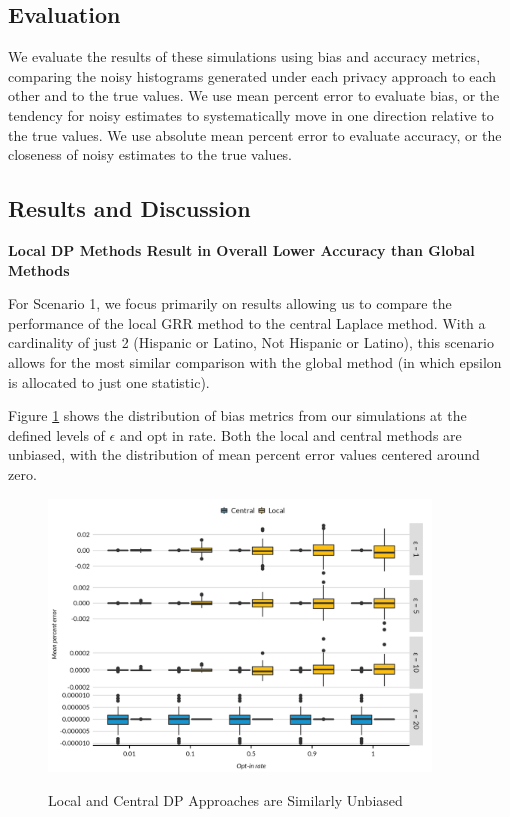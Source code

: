 \documentclass[
]{urban-formatting}
\begin{document}
\subsection{Evaluation}

We evaluate the results of these simulations using bias and accuracy
metrics, comparing the noisy histograms generated under each privacy
approach to each other and to the true values. We use mean percent error
to evaluate bias, or the tendency for noisy estimates to systematically
move in one direction relative to the true values. We use absolute mean
percent error to evaluate accuracy, or the closeness of noisy estimates
to the true values.

\subsection{Results and Discussion}

\textbf{Local DP Methods Result in Overall Lower Accuracy than Global
Methods}

For Scenario 1, we focus primarily on results allowing us to compare the
performance of the local GRR method to the central Laplace method. With
a cardinality of just 2 (Hispanic or Latino, Not Hispanic or Latino),
this scenario allows for the most similar comparison with the global
method (in which epsilon is allocated to just one statistic).

Figure \ref{fig:methods-bias} shows the distribution of bias metrics
from our simulations at the defined levels of \(\epsilon\) and opt in
rate. Both the local and central methods are unbiased, with the
distribution of mean percent error values centered around zero.

\begin{figure}[!htb]
    \centering
    \caption{Local and Central DP Approaches are Similarly Unbiased}
    \includegraphics[width=4in]{../figures/methods_bias.png}
    \label{fig:methods-bias}
\end{figure}
\end{document}
